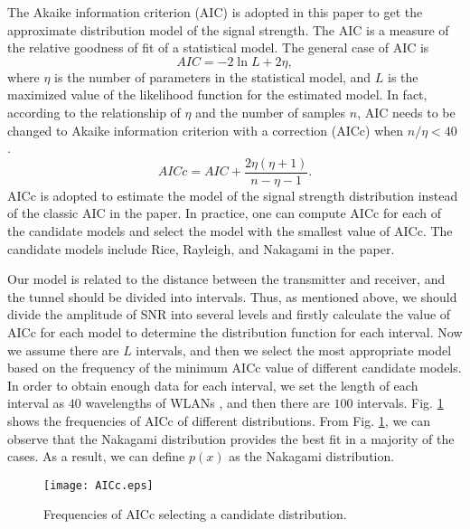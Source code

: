 \documentclass[conference]{IEEEtran}
\begin{document}
The Akaike information criterion (AIC) is adopted in this paper to get the approximate distribution model of the signal strength. The AIC is a measure of the relative goodness of fit of a statistical model. The general case of AIC is \cite{Model_selection_and_multimodel_inference}
\begin{equation}
AIC=-2\ln{L}+2\eta,
\end{equation}
where $\eta$ is the number of parameters in the statistical model, and $L$ is the maximized value of the likelihood function for the estimated model.
In fact, according to the relationship of $\eta$ and the number of samples $n$, AIC needs to be changed to Akaike information criterion with a correction (AICc) when ${n}/\eta<40$ \cite{Model_selection_and_multimodel_inference}.
\begin{equation}
AICc=AIC+\frac{2\eta(\eta+1)}{n-\eta-1}.
\label{F_AICc}
\end{equation}
AICc is adopted to estimate the model of the signal strength distribution instead of the classic AIC in the paper. In practice, one can compute AICc for each of the candidate models and select the model with the smallest value of AICc. The candidate models include Rice, Rayleigh, and Nakagami in the paper.

Our model is related to the distance between the transmitter and receiver, and the tunnel should be divided into intervals. Thus, as mentioned above, we should divide the amplitude of SNR into several levels and firstly calculate the value of AICc for each model to determine the distribution function for each interval. Now we assume there are $L$ intervals, and then we select the most appropriate model based on the frequency of the minimum AICc value of different candidate models. In order to obtain enough data for each interval, we set the length of each interval as $40$ wavelengths of WLANs \cite{A_statistical_model_for_indoor_office_wireless_sensor_channels}, and then there are $100$ intervals. Fig. \ref{AICc} shows the frequencies of AICc of different distributions. From Fig. \ref{AICc}, we can observe that the Nakagami distribution provides the best fit in a majority of the cases. As a result, we can define $p(x)$ as the Nakagami distribution.

\begin{figure}[tp]
\centering
\texttt{[image: AICc.eps]}
\caption{Frequencies of AICc selecting a candidate distribution.}
\label{AICc}
\end{figure}
\end{document}

